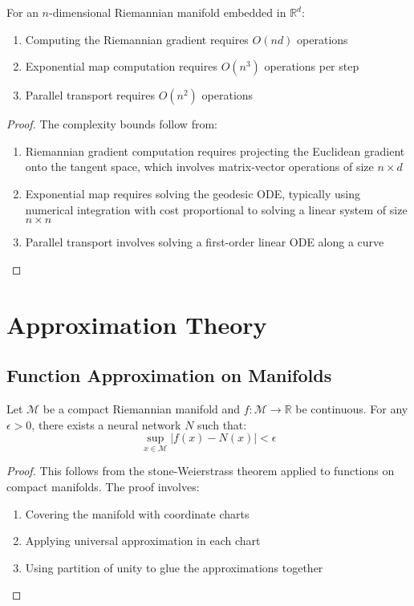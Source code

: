\begin{theorem}
\label{thm:riemannian_complexity}
For an $n$-dimensional Riemannian manifold embedded in $\mathbb{R}^d$:
\begin{enumerate}
\item Computing the Riemannian gradient requires $O(nd)$ operations
\item Exponential map computation requires $O(n^3)$ operations per step
\item Parallel transport requires $O(n^2)$ operations
\end{enumerate}
\end{theorem}

\begin{proof}
The complexity bounds follow from:
\begin{enumerate}
\item Riemannian gradient computation requires projecting the Euclidean gradient onto the tangent space, which involves matrix-vector operations of size $n \times d$
\item Exponential map requires solving the geodesic ODE, typically using numerical integration with cost proportional to solving a linear system of size $n \times n$
\item Parallel transport involves solving a first-order linear ODE along a curve
\end{enumerate}
\end{proof}

\section{Approximation Theory}

\subsection{Function Approximation on Manifolds}

\begin{theorem}
\label{thm:universal_approximation_manifolds}
Let $\mathcal{M}$ be a compact Riemannian manifold and $f: \mathcal{M} \to \mathbb{R}$ be continuous. For any $\epsilon > 0$, there exists a neural network $N$ such that:
$$\sup_{x \in \mathcal{M}} |f(x) - N(x)| < \epsilon$$
\end{theorem}

\begin{proof}
This follows from the stone-Weierstrass theorem applied to functions on compact manifolds. The proof involves:
\begin{enumerate}
\item Covering the manifold with coordinate charts
\item Applying universal approximation in each chart
\item Using partition of unity to glue the approximations together
\end{enumerate}
\end{proof}

